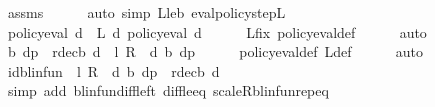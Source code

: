 \begin{isabellebody}
\ assms\isanewline
\ \ \ \ \isamarkupfalse%
\ {\isacharparenleft}{\kern0pt}auto\ simp{\isacharcolon}{\kern0pt}\ L{\isacharunderscore}{\kern0pt}le{\isacharunderscore}{\kern0pt}{\isasymL}\isactrlsub b\ eval{\isacharunderscore}{\kern0pt}policy{\isacharunderscore}{\kern0pt}step{\isacharunderscore}{\kern0pt}L{\isacharparenright}{\kern0pt}\isanewline
\ \ \isamarkupfalse%
\ {\isachardoublequoteopen}policy{\isacharunderscore}{\kern0pt}eval\ d\ {\isasymle}\ L\ {\isacharquery}{\kern0pt}d{\isacharprime}{\kern0pt}\ {\isacharparenleft}{\kern0pt}policy{\isacharunderscore}{\kern0pt}eval\ d{\isacharparenright}{\kern0pt}{\isachardoublequoteclose}\isanewline
\ \ \ \ \isamarkupfalse%
\ L{\isacharunderscore}{\kern0pt}{\isasymnu}{\isacharunderscore}{\kern0pt}fix\ policy{\isacharunderscore}{\kern0pt}eval{\isacharunderscore}{\kern0pt}def\isanewline
\ \ \ \ \isamarkupfalse%
\ auto\isanewline
\ \ \isamarkupfalse%
\ {\isachardoublequoteopen}{\isasymnu}\isactrlsub b\ {\isacharquery}{\kern0pt}dp\ {\isasymle}\ r{\isacharunderscore}{\kern0pt}dec\isactrlsub b\ {\isacharquery}{\kern0pt}d{\isacharprime}{\kern0pt}\ {\isacharplus}{\kern0pt}\ l\ {\isacharasterisk}{\kern0pt}\isactrlsub R\ {\isasymP}\ {\isacharquery}{\kern0pt}d{\isacharprime}{\kern0pt}\ {\isacharparenleft}{\kern0pt}{\isasymnu}\isactrlsub b\ {\isacharquery}{\kern0pt}dp{\isacharparenright}{\kern0pt}{\isachardoublequoteclose}\isanewline
\ \ \ \ \isamarkupfalse%
\ policy{\isacharunderscore}{\kern0pt}eval{\isacharunderscore}{\kern0pt}def\ L{\isacharunderscore}{\kern0pt}def\isanewline
\ \ \ \ \isamarkupfalse%
\ auto\isanewline
\ \ \isamarkupfalse%
\ {\isachardoublequoteopen}{\isacharparenleft}{\kern0pt}id{\isacharunderscore}{\kern0pt}blinfun\ {\isacharminus}{\kern0pt}\ l\ {\isacharasterisk}{\kern0pt}\isactrlsub R\ {\isasymP}\ {\isacharquery}{\kern0pt}d{\isacharprime}{\kern0pt}{\isacharparenright}{\kern0pt}\ {\isacharparenleft}{\kern0pt}{\isasymnu}\isactrlsub b\ {\isacharquery}{\kern0pt}dp{\isacharparenright}{\kern0pt}\ {\isasymle}\ r{\isacharunderscore}{\kern0pt}dec\isactrlsub b\ {\isacharquery}{\kern0pt}d{\isacharprime}{\kern0pt}{\isachardoublequoteclose}\isanewline
\ \ \ \ \isamarkupfalse%
\ {\isacharparenleft}{\kern0pt}simp\ add{\isacharcolon}{\kern0pt}\ blinfun{\isachardot}{\kern0pt}diff{\isacharunderscore}{\kern0pt}left\ diff{\isacharunderscore}{\kern0pt}le{\isacharunderscore}{\kern0pt}eq\ scaleR{\isacharunderscore}{\kern0pt}blinfun{\isachardot}{\kern0pt}rep{\isacharunderscore}{\kern0pt}eq{\isacharparenright}{\kern0pt}\isanewline

\end{isabellebody}
